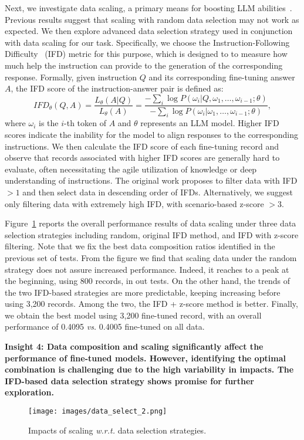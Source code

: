 Next, we investigate data scaling, a primary means for boosting LLM abilities~\cite{emgrgent-ability}. 
Previous results suggest that scaling with random data selection may not work as expected. We then explore advanced data selection strategy used in conjunction with data scaling for our task. Specifically, we choose the Instruction-Following Difficulty~\cite{li2024quantityqualityboostingllm} (IFD) metric for this purpose, which is designed to to measure how much help the instruction can provide to the generation of the corresponding response. Formally, given instruction $Q$ and its corresponding fine-tuning answer $A$, the IFD score of the instruction-answer pair is defined as:
\begin{equation} \label{eq:ifd}
    IFD_\theta(Q,A) =\frac{L_\theta(A|Q)}{L_\theta(A)}
       =\frac{- \sum_{i} \log P(\omega_i|Q, \omega_1, \dots, \omega_{i-1}; \theta)}{- \sum_{i} \log P(\omega_i|\omega_1, \dots, \omega_{i-1}; \theta)},
\end{equation}
where $\omega_i$ is the $i$-th token of $A$ and $\theta$ represents an LLM model. Higher IFD scores indicate the inability for the model to align responses to the corresponding instructions. 
We then calculate the IFD score of each fine-tuning record and observe that records associated with higher IFD scores are generally hard to evaluate, often necessitating the agile utilization of knowledge or deep understanding of instructions. The original work proposes to filter data with IFD $>1$ and then select data in descending order of IFDs. Alternatively, we suggest only filtering data with extremely high IFD, \eg with scenario-based z-score $>3$. 


Figure~\ref{fig:data_select} reports the overall performance results of data scaling under three data selection strategies including random, original IFD method, and IFD with z-score filtering. Note that we fix the best data composition ratios identified in the previous set of tests.
From the figure we find that scaling data under the random strategy does not assure increased performance. Indeed, it reaches to a peak at the beginning, \ie using 800 records, in out tests. On the other hand, the trends of the two IFD-based strategies are more predictable, keeping increasing before using 3,200 records. Among the two, the IFD + z-score method is better. Finally, we obtain the best model using 3,200 fine-tuned record, with an overall performance of 0.4095 \emph{vs.} 0.4005 fine-tuned on all data.

\textbf{Insight 4: Data composition and scaling significantly affect the performance of fine-tuned models. However, identifying the optimal combination is challenging due to the high variability in impacts. The IFD-based data selection strategy shows promise for further exploration.}



\begin{figure}[t]
    \centering
    \texttt{[image: images/data\_select\_2.png]}
    \caption{Impacts of scaling \emph{w.r.t.} data selection strategies.}
    \label{fig:data_select}
\end{figure}

